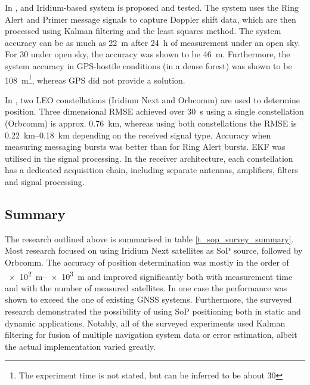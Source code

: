 In \cite{sop11}, and Iridium-based system is proposed and tested. The system uses the Ring Alert and Primer message signals to capture Doppler shift data, which are then processed using Kalman filtering and the least squares method. The system accuracy can be as much as \qty{22}{\m} after \qty{24}{\hour} of measurement under an open sky. For \qty{30}{\min} under open sky, the accuracy was shown to be \qty{46}{\m}. Furthermore, the system accuracy in GPS-hostile conditions (in a dense forest) was shown to be \qty{108}{\m}\footnote{The experiment time is not stated, but can be inferred to be about \qty{30}{\min}}, whereas GPS did not provide a solution.

In \cite{sop03}, two LEO constellations (Iridium Next and Orbcomm) are used to determine position. Three dimensional RMSE achieved over \qty{30}{\s} using a single constellation (Orbcomm) is approx. \qty{0.76}{\km}, whereas using both constellations the RMSE is \qtyrange{0.22}{0.18}{\km} depending on the received signal type. Accuracy when measuring messaging bursts was better than for Ring Alert bursts. EKF was utilised in the signal processing. In the receiver architecture, each constellation has a dedicated acquisition chain, including separate antennas, amplifiers, filters and signal processing.


\subsection{Summary}
The research outlined above is summarised in table \ref{t_sop_survey_summary}. Most research focused on using Iridium Next satellites as SoP source, followed by Orbcomm. The accuracy of position determination was mostly in the order of \qtyrange{e2}{e3}{\m} and improved significantly both with measurement time and with the number of measured satellites. In one case the performance was shown to exceed the one of existing GNSS systems. Furthermore, the surveyed research demonstrated the possibility of using SoP positioning both in static and dynamic applications. Notably, all of the surveyed experiments used Kalman filtering for fusion of multiple navigation system data or error estimation, albeit the actual implementation varied greatly.

